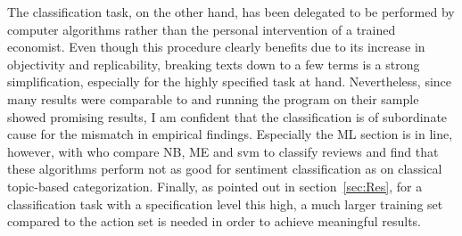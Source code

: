 The classification task, on the other hand, has been delegated to be performed by computer algorithms rather than the personal intervention of a trained economist. Even though this procedure clearly benefits due to its increase in objectivity and replicability, breaking texts down to a few terms is a strong simplification, especially for the highly specified task at hand. Nevertheless, since many results were comparable to \textcite{Ellingsen.2003} and running the program on their sample showed promising results, I am confident that the classification is of subordinate cause for the mismatch in empirical findings. Especially the ML section is in line, however,  with \textcite{Pang.2002} who compare NB, ME and svm to classify reviews and find that these algorithms perform not as good for sentiment classification as on classical topic-based categorization. Finally, as pointed out in section~\ref{sec:Res}, for a classification task with a specification level this high, a much larger training set compared to the action set is needed in order to achieve meaningful results. 